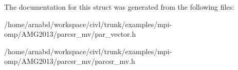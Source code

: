 The documentation for this struct was generated from the following files\+:\begin{DoxyCompactItemize}
\item 
/home/arnabd/workspace/civl/trunk/examples/mpi-\/omp/\+A\+M\+G2013/parcsr\+\_\+mv/par\+\_\+vector.\+h\item 
/home/arnabd/workspace/civl/trunk/examples/mpi-\/omp/\+A\+M\+G2013/parcsr\+\_\+mv/parcsr\+\_\+mv.\+h\end{DoxyCompactItemize}
